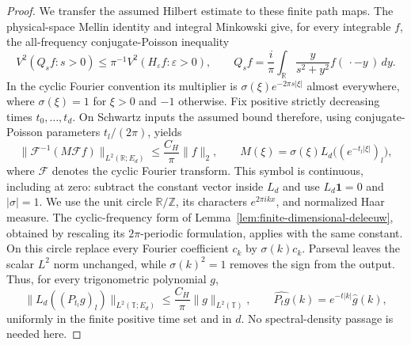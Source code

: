 \documentclass[11pt]{article}
\numberwithin{equation}{section}
\theoremstyle{remark}
\theoremstyle{definition}
\begin{document}
\begin{proof}
We transfer the assumed Hilbert estimate to these finite path maps.
The physical-space Mellin identity and integral Minkowski give, for every
integrable $f$, the all-frequency conjugate-Poisson inequality
\begin{equation}\label{eq:positive-core-poisson-v2}
 V^2(Q_sf:s>0)\le\pi^{-1}V^2(H_\varepsilon f:\varepsilon>0),
 \qquad Q_sf=\frac{i}{\pi}\int_{\mathbb R}
              \frac{y}{s^2+y^2}f(\,\cdot-y\,)\,dy.
\end{equation}
In the cyclic Fourier convention its multiplier is
$\sigma(\xi)e^{-2\pi s|\xi|}$ almost everywhere, where
$\sigma(\xi)=1$ for $\xi>0$ and $-1$ otherwise.  Fix positive strictly
decreasing times $t_0,\ldots,t_d$.  On Schwartz inputs the assumed bound
therefore, using conjugate-Poisson parameters $t_l/(2\pi)$, yields
\begin{equation}\label{eq:positive-finite-D-poisson-v2}
 \|\mathscr F^{-1}(M\mathscr F f)\|_{L^2(\mathbb R;E_d)}
 \le \frac{C_H}{\pi}\|f\|_2,
 \qquad M(\xi)=\sigma(\xi)L_d\bigl((e^{-t_l|\xi|})_l\bigr),
\end{equation}
where $\mathscr F$ denotes the cyclic Fourier transform.
This symbol is continuous, including at zero: subtract the constant
vector inside $L_d$ and use $L_d\mathbf1=0$ and $|\sigma|=1$.
We use the unit circle $\mathbb R/\mathbb Z$, its characters
$e^{2\pi ikx}$, and normalized Haar measure.  The cyclic-frequency form
of Lemma~\ref{lem:finite-dimensional-deleeuw}, obtained by rescaling its
$2\pi$-periodic formulation, applies with the same constant.
On this circle replace every Fourier coefficient $c_k$ by
$\sigma(k)c_k$.  Parseval leaves the scalar $L^2$ norm unchanged, while
$\sigma(k)^2=1$ removes the sign from the output.  Thus, for every
trigonometric polynomial $g$,
\begin{equation}\label{eq:full-finite-D-poisson-v2}
 \bigl\|L_d((P_{t_l}g)_l)\bigr\|_{L^2(\mathbb T;E_d)}
 \le \frac{C_H}{\pi}\|g\|_{L^2(\mathbb T)},
 \qquad \widehat{P_tg}(k)=e^{-t|k|}\widehat g(k),
\end{equation}
uniformly in the finite positive time set and in $d$.
No spectral-density passage is needed here.


\end{proof}
\end{document}
